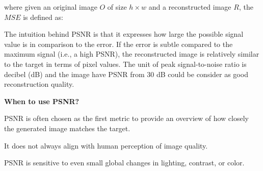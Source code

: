 where given an original image $O$ of size $h \times w$ and a reconstructed image $R$, the $MSE$ is defined as:

\vspace{-10pt}

\begin{center}
\end{center}

\vspace{-10pt}

The intuition behind PSNR is that it expresses how large the possible signal value is in comparison to the error. 
If the error is subtle compared to the maximum signal (i.e., a high PSNR), the reconstructed image is relatively similar to
the target in terms of pixel values. The unit of peak signal-to-noise ratio is decibel (dB) and the image have PSNR from 30 dB
could be consider as good reconstruction quality.



\textbf{When to use PSNR?}

PSNR is often chosen as the first metric to provide an overview of how closely the generated image matches the target.

{
\item It does not always align with human perception of image quality.
\item PSNR is sensitive to even small global changes in lighting, contrast, or color.
}


